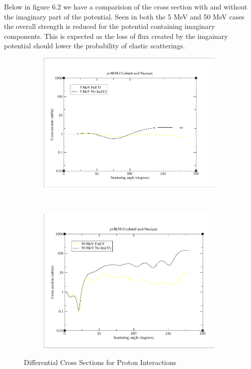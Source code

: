 \documentclass[paper=a4, fontsize=11pt]{scrartcl} %
\numberwithin{equation}{section} %
\numberwithin{figure}{section} %
\numberwithin{table}{section} %
\begin{document}
Below in figure 6.2 we have a comparision of the cross section with and without the imaginary part of the potential.  Seen in both the 5 MeV and 50 MeV cases the overall strength is reduced for the potential containing imaginary components.  This is expected as the loss of flux created by the imgainary potential should lower the probability of elastic scatterings.  

 \begin{figure}[hbt]
        \centering
        \begin{subfigure}[b!]{0.35\textwidth}
                \includegraphics[width=\textwidth]{5MeVUandNoUComp.PNG}
        \end{subfigure}%
        ~ %
\quad
        \begin{subfigure}[b!]{0.35\textwidth}
                \includegraphics[width=\textwidth]{50MeVnoUandUcomp.PNG}
        \end{subfigure}

        \caption{Differential Cross Sections for Proton Interactions}
\end{figure}
 
\end{document}
